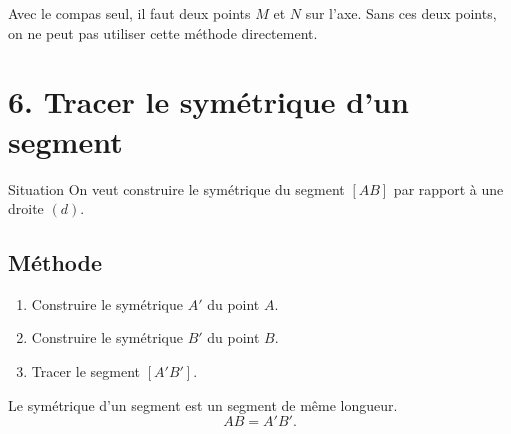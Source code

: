 \documentclass[11pt,a4paper]{article}
\begin{document}
\begin{attention}
Avec le compas seul, il faut deux points $M$ et $N$ sur l'axe.  
Sans ces deux points, on ne peut pas utiliser cette méthode directement.
\end{attention}

\section*{6. Tracer le symétrique d'un segment}

\begin{boite}{Situation}
On veut construire le symétrique du segment $[AB]$ par rapport à une droite $(d)$.
\end{boite}

\subsection*{Méthode}

\begin{enumerate}[label=\textbf{Étape \arabic* :}]
    \item Construire le symétrique $A'$ du point $A$.
    \item Construire le symétrique $B'$ du point $B$.
    \item Tracer le segment $[A'B']$.
\end{enumerate}

\begin{center}
\end{center}

\begin{retenir}
Le symétrique d'un segment est un segment de même longueur.
\[
AB=A'B'.
\]
\end{retenir}
\end{document}
